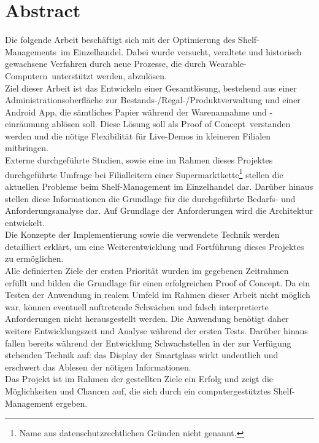 \chapter*{Abstract} %
\sloppy
Die folgende Arbeit beschäftigt sich mit der Optimierung des \glqq Shelf-Managements\grqq~im Einzelhandel. Dabei wurde versucht, veraltete und historisch gewachsene Verfahren durch neue Prozesse, die durch \glqq Wearable-Computern\grqq~unterstützt werden, abzulösen.\\

Ziel dieser Arbeit ist das Entwickeln einer Gesamtlösung, bestehend aus einer Administrationsoberfläche zur Bestands-/Regal-/Produktverwaltung und einer Android App, die sämtliches Papier während der Warenannahme und -einräumung ablösen soll. Diese Lösung soll als \glqq Proof of Concept\grqq~verstanden werden und die nötige Flexibilität für Live-Demos in kleineren Filialen mitbringen.\\

Externe durchgeführte Studien, sowie eine im Rahmen dieses Projektes durchgeführte Umfrage bei Filialleitern einer Supermarktkette\footnote{Name aus datenschutzrechtlichen Gründen nicht genannt.} stellen die aktuellen Probleme beim Shelf-Management im Einzelhandel dar. Darüber hinaus stellen diese Informationen die Grundlage für die durchgeführte Bedarfs- und Anforderungsanalyse dar. Auf Grundlage der Anforderungen wird die Architektur entwickelt.\\

Die Konzepte der Implementierung sowie die verwendete Technik werden detailliert erklärt, um eine Weiterentwicklung und Fortführung dieses Projektes zu ermöglichen.\\

Alle definierten Ziele der ersten Priorität wurden im gegebenen Zeitrahmen erfüllt und bilden die Grundlage für einen erfolgreichen \glqq Proof of Concept\grqq . Da ein Testen der Anwendung in realem Umfeld im Rahmen dieser Arbeit nicht möglich war, können eventuell auftretende Schwächen und falsch interpretierte Anforderungen nicht herausgestellt werden. Die Anwendung benötigt daher weitere Entwicklungszeit und Analyse während der ersten Tests. Darüber hinaus fallen bereits während der Entwicklung Schwachstellen in der zur Verfügung stehenden Technik auf: das Display der Smartglass wirkt undeutlich und erschwert das Ablesen der nötigen Informationen.\\

Das Projekt ist im Rahmen der gestellten Ziele ein Erfolg und zeigt die Möglichkeiten und Chancen auf, die sich durch ein computergestütztes Shelf-Management ergeben.
\fussy